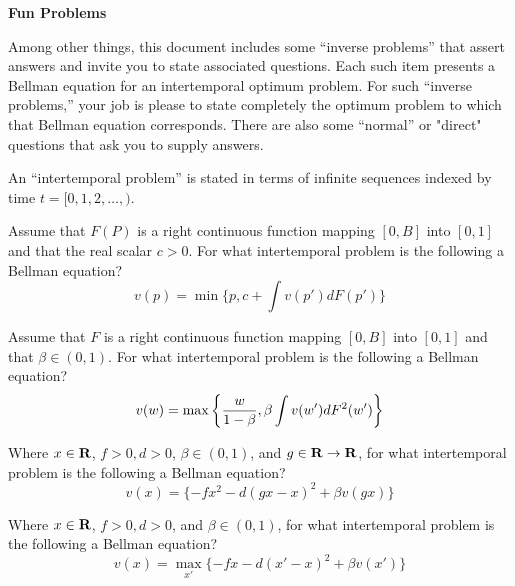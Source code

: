 

\paper

\overfullrule=0pt
\def\frac#1#2{#1\over #2}
%
\def\bmatrix#1{\left[ \matrix{#1} \right]}
\def\be{{\beta}}
\def\toone{{t+1}}

\overfullrule=0pt


\centerline{\bf  Fun Problems}


\medskip

 Among other things, this document includes some ``inverse problems'' that assert answers and invite you to state  associated questions.
 Each such item presents a Bellman equation for an intertemporal  optimum problem.  For such ``inverse problems,'' your job is please to
state completely the optimum problem to which that Bellman equation corresponds.  There are also some 
``normal'' or "direct" questions that ask you to supply answers.

\medskip
{} An ``intertemporal problem'' is stated in terms of  infinite sequences indexed by time $t = [0, 1, 2, \ldots, )$.



\medskip

Assume that  $F(P)$ is a right continuous function mapping $[0, B]$ into $[0,1]$ and that the real scalar $c > 0$.  For what intertemporal problem is the following
a Bellman equation?
$$ v(p) = \min \{p, c + \int v(p') d F(p') \}$$

\medskip



  Assume that  $F$ is a right continuous function mapping $[0, B]$ into $[0,1]$ and that $\beta \in (0,1)$. For what intertemporal problem is the following a Bellman equation?
$$ v(w) = \max\left\{ {w\over{1-\beta}},  \beta \int v(w') d F^2(w') \right\} $$



\medskip
{} Where $x \in {\bf R}$, $f >0, d >0 $,   $\beta \in (0,1)$, and $g \in  {\bf R} \rightarrow {\bf R}$, for what intertemporal problem is the following  a Bellman equation?
$$ v(x) =  \{- f x^2 - d(gx  - x)^2 + \beta v(gx) \} $$


\medskip
{}   Where $x \in {\bf R}$, $f >0, d >0 $, and   $\beta \in (0,1)$, for what intertemporal problem is the following  a Bellman equation?
$$ v(x) = \max_{x'} \{ - f x - d(x' - x)^2 + \beta v(x') \} $$


